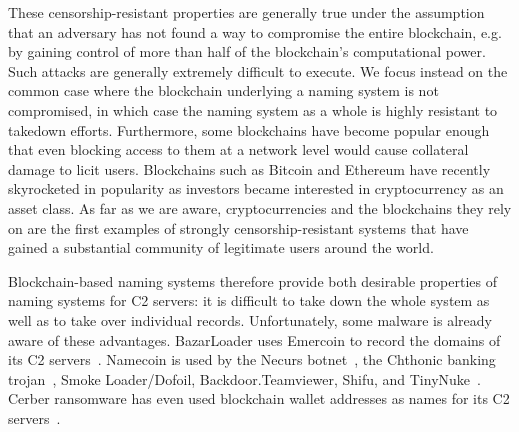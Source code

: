 These censorship-resistant properties are generally true under the assumption 
that an adversary has not found a way to compromise the entire blockchain, e.g. 
by gaining control of more than half of the blockchain's 
computational power. Such attacks are generally extremely 
difficult to execute. We focus instead on the 
common case where the blockchain underlying a naming system is not compromised, 
in which case the naming system as a whole is highly resistant to takedown 
efforts. Furthermore, some blockchains have become popular enough that even 
blocking access to them at a network level would cause collateral damage to 
licit users. Blockchains such as Bitcoin and Ethereum have recently 
skyrocketed in popularity as investors became interested in cryptocurrency as 
an asset class. As far as we are aware, cryptocurrencies and the blockchains 
they rely on are the first examples of strongly censorship-resistant systems 
that have gained a substantial community of legitimate users around the world.

Blockchain-based naming systems therefore provide both desirable properties of 
naming systems for C2 servers: it is difficult to take down the whole system as 
well as to take over individual records. Unfortunately, some malware is already 
aware of these advantages. BazarLoader uses Emercoin 
to record the domains of its C2 servers~\cite{brandt_bazarloader_2021}. 
Namecoin is used by the Necurs botnet~\cite{dgas_of_necurs}, the 
Chthonic banking trojan~\cite{malware_traffic_analysis_2016}, Smoke 
Loader/Dofoil, Backdoor.Teamviewer, Shifu, and TinyNuke~\cite{abusech_2017, 
mackie_cryptodns_2018}. Cerber ransomware has 
even used blockchain wallet addresses as names for its C2 
servers~\cite{pletinckx_malware_2018}.



